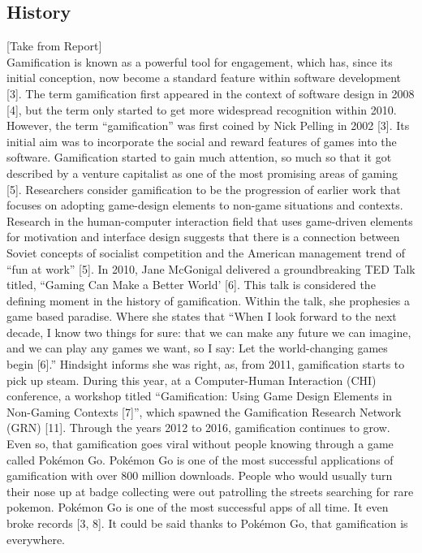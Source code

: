 \documentclass{sigchi}
\begin{document}
\subsection{History}
[Take from Report]\\

Gamification is known as a powerful tool for engagement, which has, since its initial conception, now become a standard feature within software development [3]. The term gamification first appeared in the context of software design in 2008 [4], but the term only started to get more widespread recognition within 2010. However, the term “gamification” was first coined by Nick Pelling in 2002 [3]. Its initial aim was to incorporate the social and reward features of games into the software. Gamification started to gain much attention, so much so that it got described by a venture capitalist as one of the most promising areas of gaming [5]. 
Researchers consider gamification to be the progression of earlier work that focuses on adopting game-design elements to non-game situations and contexts. Research in the human-computer interaction field that uses game-driven elements for motivation and interface design suggests that there is a connection between Soviet concepts of socialist competition and the American management trend of “fun at work” [5]. 
In 2010, Jane McGonigal delivered a groundbreaking TED Talk titled, “Gaming Can Make a Better World’ [6]. This talk is considered the defining moment in the history of gamification. Within the talk, she prophesies a game based paradise. Where she states that “When I look forward to the next decade, I know two things for sure: that we can make any future we can imagine, and we can play any games we want, so I say: Let the world-changing games begin [6].” Hindsight informs she was right, as, from 2011, gamification starts to pick up steam. During this year, at a Computer-Human Interaction (CHI) conference, a workshop titled “Gamification: Using Game Design Elements in Non-Gaming Contexts [7]”, which spawned the Gamification Research Network (GRN) [11]. Through the years 2012 to 2016, gamification continues to grow. Even so, that gamification goes viral without people knowing through a game called Pokémon Go. Pokémon Go is one of the most successful applications of gamification with over 800 million downloads. People who would usually turn their nose up at badge collecting were out patrolling the streets searching for rare pokemon. Pokémon Go is one of the most successful apps of all time. It even broke records [3, 8]. It could be said thanks to Pokémon Go, that gamification is everywhere. 
\end{document}
